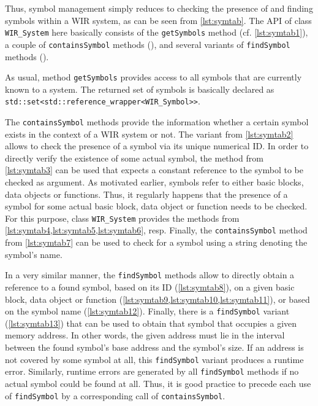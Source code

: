 Thus, symbol management simply reduces to checking the presence of and finding symbols within a \gls{WIR} system, as can be seen from \cref{lst:symtab}.
The \gls{API} of class \texttt{WIR\_System} here basically consists of the \texttt{getSymbols} method (cf. \cref{lst:symtab1}), a couple of \texttt{containsSymbol} methods (), and several variants of \texttt{findSymbol} methods ().

As usual, method \texttt{getSymbols} provides access to all symbols that are currently known to a system.
The returned set of symbols is basically declared as \texttt{std::set<std::reference\_wrapper<WIR\_Symbol>{}>}.

The \texttt{containsSymbol} methods provide the information whether a certain symbol exists in the context of a \gls{WIR} system or not.
The variant from \cref{lst:symtab2} allows to check the presence of a symbol via its unique numerical ID.
In order to directly verify the existence of some actual symbol, the method from \cref{lst:symtab3} can be used that expects a constant reference to the symbol to be checked as argument.
As motivated earlier, symbols refer to either basic blocks, data objects or functions.
Thus, it regularly happens that the presence of a symbol for some actual basic block, data object or function needs to be checked.
For this purpose, class \texttt{WIR\_System} provides the methods from \cref{lst:symtab4,lst:symtab5,lst:symtab6}, resp.
Finally, the \texttt{containsSymbol} method from \cref{lst:symtab7} can be used to check for a symbol using a string denoting the symbol's name.

In a very similar manner, the \texttt{findSymbol} methods allow to directly obtain a reference to a found symbol, based on its ID (\cref{lst:symtab8}), on a given basic block, data object or function (\cref{lst:symtab9,lst:symtab10,lst:symtab11}), or based on the symbol name (\cref{lst:symtab12}).
Finally, there is a \texttt{findSymbol} variant (\cref{lst:symtab13}) that can be used to obtain that symbol that occupies a given memory address.
In other words, the given address must lie in the interval between the found symbol's base address and the symbol's size.
If an address is not covered by some symbol at all, this \texttt{findSymbol} variant produces a runtime error.
Similarly, runtime errors are generated by all \texttt{findSymbol} methods if no actual symbol could be found at all.
Thus, it is good practice to precede each use of \texttt{findSymbol} by a corresponding call of \texttt{containsSymbol}.

